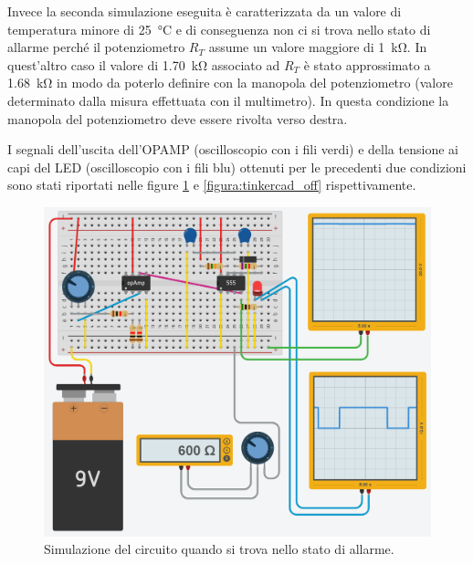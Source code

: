 \documentclass{report}
\begin{document}
Invece la seconda simulazione eseguita è caratterizzata da un valore di temperatura minore di \SI{25}{\celsius} e di conseguenza non ci si trova nello stato di allarme perché il potenziometro $R_T$ assume un valore maggiore di \SI{1}{\kilo\ohm}. In quest'altro caso il valore di \SI{1.70}{\kilo\ohm} associato ad $R_T$ è stato approssimato a \SI{1.68}{\kilo\ohm} in modo da poterlo definire con la manopola del potenziometro (valore determinato dalla misura effettuata con il multimetro). In questa condizione la manopola del potenziometro deve essere rivolta verso destra.

I segnali dell'uscita dell'OPAMP (oscilloscopio con i fili verdi) e della tensione ai capi del LED (oscilloscopio con i fili blu) ottenuti per le precedenti due condizioni sono stati riportati nelle figure \ref{figura:tinkercad_on} e \ref{figura:tinkercad_off} rispettivamente.

\begin{figure}[h!]
	\centering
	\includegraphics[width=\textwidth]{immagini/tinkercad_on}
	\caption{Simulazione del circuito quando si trova nello stato di allarme.} 
	\label{figura:tinkercad_on}
\end{figure}
\end{document}
